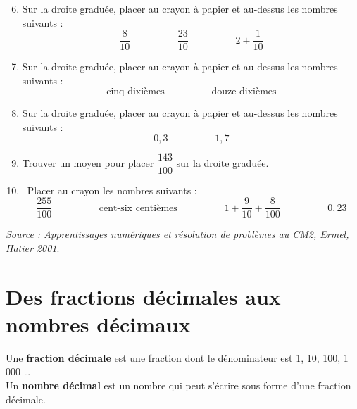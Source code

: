 \begin{activite}
\begin{QCM}
         \begin{enumerate}
            \setcounter{enumi}{5}
            \item Sur la droite graduée, placer au crayon à papier et au-dessus les nombres suivants :
               $$\dfrac{8}{10} \hspace{2cm} \dfrac{23}{10} \hspace{2cm} 2+\dfrac{1}{10}$$
            \item Sur la droite graduée, placer au crayon à papier et au-dessus les nombres suivants :
               $$\text{cinq dixièmes} \hspace{2cm} \text{douze dixièmes}$$
            \item Sur la droite graduée, placer au crayon à papier et au-dessus les nombres suivants :
               $$0,3 \hspace{2cm} 1,7$$
            \item Trouver un moyen pour placer $\dfrac{143}{100}$ sur la droite graduée. \\
            \item \, Placer au crayon les nombres suivants :
               $$\dfrac{255}{100} \hspace{2cm} \text{cent-six centièmes} \hspace{2cm} 1+\dfrac{9}{10}+\dfrac{8}{100} \hspace{2cm} 0,23$$
         \end{enumerate}
      \end{QCM}
   \vfill\hfill{\it\footnotesize Source : Apprentissages numériques et résolution de problèmes au CM2, Ermel, Hatier 2001}.
\end{activite}


\cours 

\section{Des fractions décimales aux nombres décimaux}

\begin{definition}
   Une {\bf fraction décimale} est une fraction dont le dénominateur est  1, 10, 100, 1\,000 \dots \\
   Un {\bf nombre décimal} est un nombre qui peut s'écrire sous forme d'une fraction décimale.
\end{definition}

